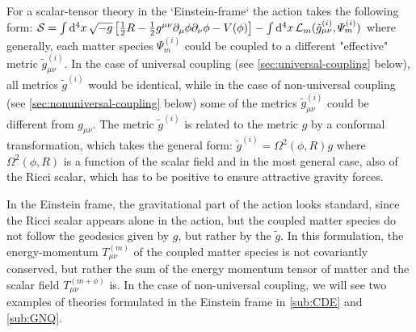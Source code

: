 For a scalar-tensor theory in the `Einstein-frame` the action takes the following form:
\beeqc$\label{eq:einstein-frame-action}
\mathcal{S} = \int \mathrm{d}^{4} {x} \, \sqrt{-g} \left[  \frac{1}{2} R - \frac{1}{2} g^{\mu \nu}  \partial_{\mu}\phi \partial_{\nu}\phi 
- V(\phi)    \right] - \int \mathrm{d}^{4} {x} \, \mathcal{L}_m (\tilde{g}^{(i)}_{\mu \nu} , \varPsi_m^{(i)} )
$
where generally, each matter species $\varPsi_m^{(i)}$ could be coupled to a different "effective" metric $\tilde{g}^{(i)}_{\mu \nu}$.
In the case of universal coupling (see \cref{sec:universal-coupling} below), all metrics $\tilde{g}^{(i)}$ would be identical, 
while in the case of non-universal coupling (see \cref{sec:nonuniversal-coupling} below) some of the metrics $\tilde{g}^{(i)}_{\mu \nu}$ could
be different from $g_{\mu \nu}$.
The metric $\tilde{g}^{(i)}$ is related to the metric $g$ by a conformal transformation, which takes the general form:
\beeqc$
\tilde{g}^{(i)} = \Omega^2(\phi, R) g
$
where $\Omega^2(\phi, R)$ is a function of the scalar field and in the most general case, also of the Ricci scalar, which has to be positive
to ensure attractive gravity forces.

In the Einstein frame, the gravitational part of the action looks standard, since the Ricci scalar appears alone in the action,
but the coupled matter species do not follow the geodesics given by $g$, but rather by the $\tilde g$. 
In this formulation, the energy-momentum $T^{(m)}_{\mu \nu}$ of the coupled matter species is not covariantly conserved, but rather
the sum of the energy momentum tensor of matter and the scalar field $T^{(m+\phi)}_{\mu \nu}$ is.
In the case of non-universal coupling, we will see two examples of theories formulated in the Einstein frame in \cref{sub:CDE} and \cref{sub:GNQ}.

